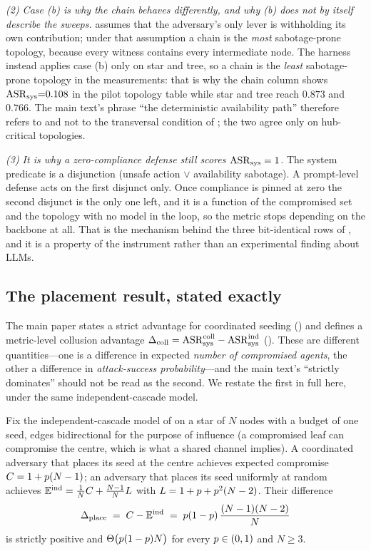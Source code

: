 \emph{(2) Case (b) is why the chain behaves differently, and why
(b) does not by itself describe the sweeps.}  assumes that
the adversary's only lever is withholding its own contribution; under that assumption a chain
is the \emph{most} sabotage-prone topology, because every witness contains every intermediate
node. The harness instead applies case (b) only on star and tree, so a chain is the
\emph{least} sabotage-prone topology in the measurements: that is why the chain column shows
$\mathrm{ASR}_{\mathrm{sys}}{=}0.108$ in the pilot topology table while star and tree reach $0.873$ and $0.766$.
The main text's phrase ``the deterministic availability path'' therefore refers to
 and not to the transversal condition of ; the two agree
only on hub-critical topologies.

\emph{(3) It is why a zero-compliance defense still scores $\mathrm{ASR}_{\mathrm{sys}}=1$.} The system predicate is
a disjunction (unsafe action $\lor$ availability sabotage). A prompt-level defense acts on the
first disjunct only. Once compliance is pinned at zero the second disjunct is the only one
left, and it is a function of the compromised set and the topology with no model in the loop,
so the metric stops depending on the backbone at all. That is the mechanism behind the three
bit-identical rows of , and it is a property of the instrument rather than
an experimental finding about LLMs.

\subsection{The placement result, stated exactly}
\label{app:placement}

The main paper states a strict advantage for coordinated seeding
() and defines a metric-level collusion advantage
$\Delta_{\mathrm{coll}}=\mathrm{ASR}_{\mathrm{sys}}^{\mathrm{coll}}-\mathrm{ASR}_{\mathrm{sys}}^{\mathrm{ind}}$
(). These are different quantities---one is a difference in expected
\emph{number of compromised agents}, the other a difference in \emph{attack-success
probability}---and the main text's ``strictly dominates'' should not be read as the second.
We restate the first in full here, under the same independent-cascade model.

\begin{proposition}
\label{prop:placement}
Fix the independent-cascade model of  on a star of $N$ nodes with a budget of
one seed, edges bidirectional for the purpose of influence (a compromised leaf can compromise
the centre, which is what a shared channel implies). A coordinated adversary that places its
seed at the centre achieves expected compromise
$C=1+p(N-1)$; an adversary that places its seed uniformly at random achieves
$\mathbb{E}^{\mathrm{ind}}=\tfrac1N C+\tfrac{N-1}{N}L$ with $L=1+p+p^{2}(N-2)$. Their
difference
\[
\Delta_{\mathrm{place}}\;=\;C-\mathbb{E}^{\mathrm{ind}}
\;=\;p(1-p)\,\frac{(N-1)(N-2)}{N}
\]
is strictly positive and $\Theta\bigl(p(1-p)N\bigr)$ for every $p\in(0,1)$ and
$N\ge3$.
\end{proposition}

